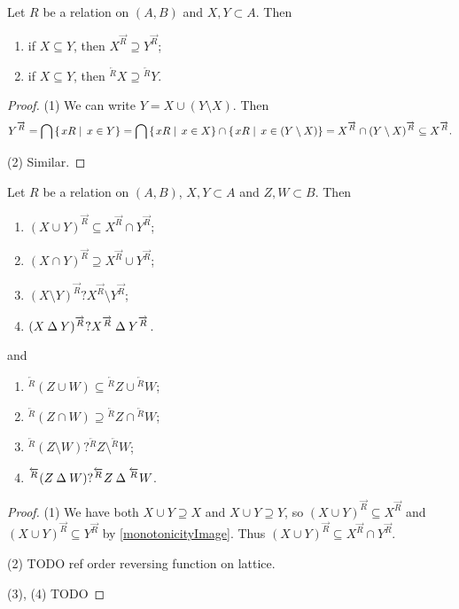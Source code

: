 \begin{corollary} \label{monotonicityCommonality}
Let $R$ be a relation on $(A, B)$ and $X,Y\subset A$. Then
\begin{enumerate}
\item if $X\subseteq Y$, then $X^{\overrightarrow{R}} \supseteq Y^{\overrightarrow{R}}$;
\item if $X\subseteq Y$, then ${^{\overleftarrow{R}}X} \supseteq {^{\overleftarrow{R}}Y}$.
\end{enumerate}
\end{corollary}
\begin{proof}
(1) We can write $Y = X \cup (Y\setminus X)$. Then
\[ Y^{\overrightarrow{R}} = \bigcap \left\{\left. xR \;\right|\; x\in Y \right\} = \bigcap \left\{\left. xR \;\right|\; x\in X \right\}\cap\left\{\left. xR \;\right|\; x\in (Y\setminus X) \right\} = X^{\overrightarrow{R}} \cap (Y\setminus X)^{\overrightarrow{R}} \subseteq X^{\overrightarrow{R}}. \]

(2) Similar.
\end{proof}
\begin{corollary} \label{commonalityRelation} \label{precommonalityRelation}
Let $R$ be a relation on $(A, B)$, $X,Y\subset A$ and $Z,W\subset B$. Then
\begin{enumerate}
\item $(X\cup Y)^{\overrightarrow{R}} \subseteq X^{\overrightarrow{R}}\cap Y^{\overrightarrow{R}}$;
\item $(X\cap Y)^{\overrightarrow{R}} \supseteq X^{\overrightarrow{R}}\cup Y^{\overrightarrow{R}}$;
\item $(X\setminus Y)^{\overrightarrow{R}} ? X^{\overrightarrow{R}}\setminus Y^{\overrightarrow{R}}$;
\item $(X\mathbin{\Delta} Y)^{\overrightarrow{R}} ? X^{\overrightarrow{R}}\mathbin{\Delta} Y^{\overrightarrow{R}}$.
\end{enumerate}
and
\begin{enumerate}
\item $^{\overleftarrow{R}}(Z\cup W) \subseteq {^{\overleftarrow{R}}Z}\cup {^{\overleftarrow{R}}W}$;
\item $^{\overleftarrow{R}}(Z\cap W) \supseteq {^{\overleftarrow{R}}Z}\cap {^{\overleftarrow{R}}W}$;
\item $^{\overleftarrow{R}}(Z\setminus W) ? {^{\overleftarrow{R}}Z}\setminus {^{\overleftarrow{R}}W}$;
\item $^{\overleftarrow{R}}(Z\mathbin{\Delta} W) ? {^{\overleftarrow{R}}Z}\mathbin{\Delta} {^{\overleftarrow{R}}W}$.
\end{enumerate}
\end{corollary}
\begin{proof}\mbox{}
(1) We have both $X\cup Y \supseteq X$ and $X\cup Y \supseteq Y$, so $(X\cup Y)^{\overrightarrow{R}} \subseteq X^{\overrightarrow{R}}$ and $(X\cup Y)^{\overrightarrow{R}} \subseteq Y^{\overrightarrow{R}}$ by \ref{monotonicityImage}. Thus $(X\cup Y)^{\overrightarrow{R}} \subseteq X^{\overrightarrow{R}}\cap Y^{\overrightarrow{R}}$.

(2) TODO ref order reversing function on lattice.

(3), (4) TODO
\end{proof}

